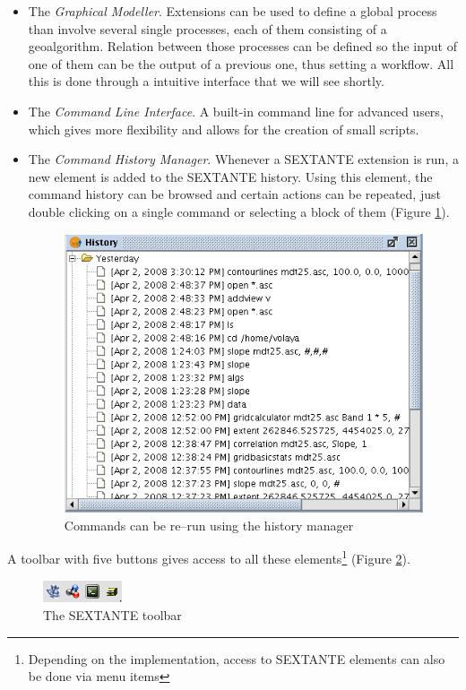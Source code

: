 \documentclass[12pt,a4paper,twocolumn]{article}
\begin{document}
\begin{itemize}
	\item The \emph{Graphical Modeller}. Extensions can be used to define a global process than involve several single processes, each of them consisting of a geoalgorithm. Relation between those processes can be defined so the input of one of them can be the output of a previous one, thus setting a workflow. All this is done through a intuitive interface that we will see shortly.
	\item The \emph{Command Line Interface}. A built-in command line for advanced users, which gives more flexibility and allows for the creation of small scripts. 
	\item The \emph{Command History Manager}. Whenever a SEXTANTE extension is run, a new element is added to the SEXTANTE history. Using this element, the command history can be browsed and certain actions can be repeated, just double clicking on a single command or selecting a block of them (Figure \ref{Fig:History}).

\begin{figure}[!hbt]
 \centering
 \includegraphics[width=.9\columnwidth]{History.png}
 \caption{Commands can be re--run using the history manager}
\label{Fig:History}
\end{figure}

\end{itemize}

A toolbar with five buttons gives access to all these elements\footnote{Depending on the implementation, access to SEXTANTE elements can also be done via menu items} (Figure \ref{Fig:Toolbar}).

\begin{figure}[!hbt]
 \centering
 \includegraphics[width=.3\columnwidth]{Toolbar.png}
\caption{The SEXTANTE toolbar}
\label{Fig:Toolbar}
\end{figure}
\end{document}
